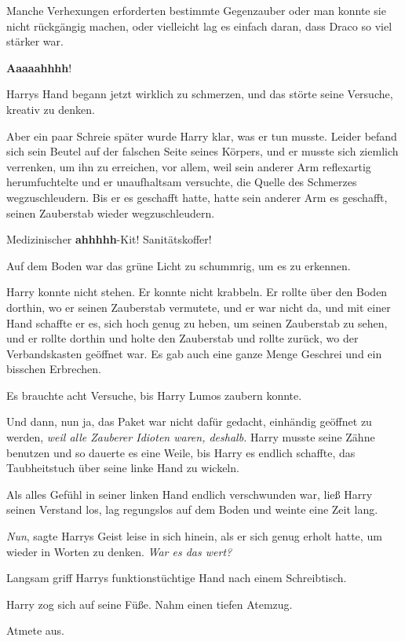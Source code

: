 Manche Verhexungen erforderten bestimmte Gegenzauber oder man konnte sie nicht
rückgängig machen, oder vielleicht lag es einfach daran, dass Draco so viel
stärker war.

\glqq \textbf{Aaaaahhhh}!\grqq{}

Harrys Hand begann jetzt wirklich zu schmerzen, und das störte seine Versuche,
kreativ zu denken.

Aber ein paar Schreie später wurde Harry klar, was er tun musste. Leider befand
sich sein Beutel auf der falschen Seite seines Körpers, und er musste sich
ziemlich verrenken, um ihn zu erreichen, vor allem, weil sein anderer Arm
reflexartig herumfuchtelte und er unaufhaltsam versuchte, die Quelle des
Schmerzes wegzuschleudern. Bis er es geschafft hatte, hatte sein anderer Arm es
geschafft, seinen Zauberstab wieder wegzuschleudern.

\glqq Medizinischer \textbf{ahhhhh}-Kit! Sanitätskoffer!\grqq{}

Auf dem Boden war das grüne Licht zu schummrig, um es zu erkennen.

Harry konnte nicht stehen. Er konnte nicht krabbeln. Er rollte über den Boden
dorthin, wo er seinen Zauberstab vermutete, und er war nicht da, und mit einer
Hand schaffte er es, sich hoch genug zu heben, um seinen Zauberstab zu sehen,
und er rollte dorthin und holte den Zauberstab und rollte zurück, wo der
Verbandskasten geöffnet war. Es gab auch eine ganze Menge Geschrei und ein
bisschen Erbrechen.

Es brauchte acht Versuche, bis Harry Lumos zaubern konnte.

Und dann, nun ja, das Paket war nicht dafür gedacht, einhändig geöffnet zu
werden, \emph{weil alle Zauberer Idioten waren, deshalb.} Harry musste seine
Zähne benutzen und so dauerte es eine Weile, bis Harry es endlich schaffte, das
Taubheitstuch über seine linke Hand zu wickeln.

Als alles Gefühl in seiner linken Hand endlich verschwunden war, ließ Harry
seinen Verstand los, lag regungslos auf dem Boden und weinte eine Zeit lang.

\emph{Nun}, sagte Harrys Geist leise in sich hinein, als er sich genug erholt
hatte, um wieder in Worten zu denken.\emph{ War es das wert?}

Langsam griff Harrys funktionstüchtige Hand nach einem Schreibtisch.

Harry zog sich auf seine Füße. Nahm einen tiefen Atemzug.

Atmete aus.

